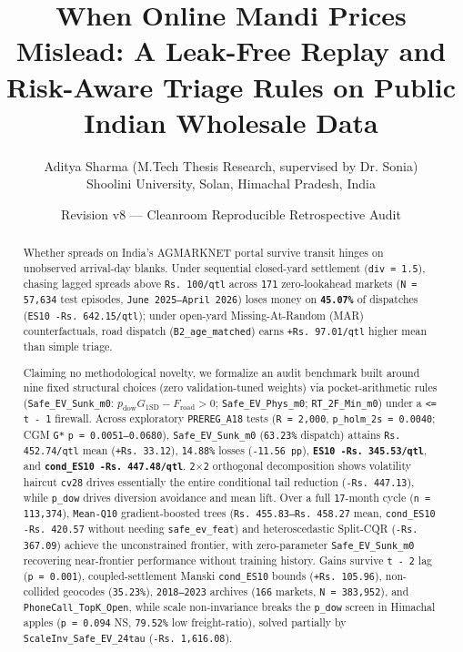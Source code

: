 \documentclass[11pt,a4paper]{article}
\title{When Online Mandi Prices Mislead: A Leak-Free Replay and Risk-Aware Triage Rules on Public Indian Wholesale Data}
\author{Aditya Sharma (M.Tech Thesis Research, supervised by Dr. Sonia) \\ Shoolini University, Solan, Himachal Pradesh, India}
\date{Revision v8 --- Cleanroom Reproducible Retrospective Audit}
\begin{document}
\maketitle

\begin{abstract}
Whether spreads on India's AGMARKNET portal survive transit hinges on unobserved arrival-day blanks. Under sequential closed-yard settlement (\texttt{div = 1.5}), chasing lagged spreads above \texttt{Rs.\,100/qtl} across \texttt{171} zero-lookahead markets (\texttt{N = 57,634} test episodes, \texttt{June 2025--April 2026}) loses money on \textbf{\texttt{45.07\%}} of dispatches (\texttt{ES10 -Rs.\,642.15/qtl}); under open-yard Missing-At-Random (MAR) counterfactuals, road dispatch (\texttt{B2\_age\_matched}) earns \texttt{+Rs.\,97.01/qtl} higher mean than simple triage.

Claiming no methodological novelty, we formalize an audit benchmark built around nine fixed structural choices (zero validation-tuned weights) via pocket-arithmetic rules (\texttt{Safe\_EV\_Sunk\_m0}: $p_{\text{dow}} G_{\text{1SD}} - F_{\text{road}} > 0$; \texttt{Safe\_EV\_Phys\_m0}; \texttt{RT\_2F\_Min\_m0}) under a \texttt{<= t - 1} firewall. Across exploratory \texttt{PREREG\_A18} tests (\texttt{R = 2,000}, \texttt{p\_holm\_2s = 0.0040}; CGM \texttt{G*} \texttt{p = 0.0051--0.0680}), \texttt{Safe\_EV\_Sunk\_m0} (\texttt{63.23\%} dispatch) attains \texttt{Rs.\,452.74/qtl} mean (\texttt{+Rs.\,33.12}), \texttt{14.88\%} losses (\texttt{-11.56 pp}), \textbf{\texttt{ES10 -Rs.\,345.53/qtl}}, and \textbf{\texttt{cond\_ES10 -Rs.\,447.48/qtl}}. \texttt{2$\times$2} orthogonal decomposition shows volatility haircut \texttt{cv28} drives essentially the entire conditional tail reduction (\texttt{-Rs.\,447.13}), while \texttt{p\_dow} drives diversion avoidance and mean lift. Over a full \texttt{17}-month cycle (\texttt{n = 113,374}), \texttt{Mean-Q10} gradient-boosted trees (\texttt{Rs.\,455.83--Rs.\,458.27} mean, \texttt{cond\_ES10 -Rs.\,420.57} without needing \texttt{safe\_ev\_feat}) and heteroscedastic Split-CQR (\texttt{-Rs.\,367.09}) achieve the unconstrained frontier, with zero-parameter \texttt{Safe\_EV\_Sunk\_m0} recovering near-frontier performance without training history. Gains survive \texttt{t - 2} lag (\texttt{p = 0.001}), coupled-settlement Manski \texttt{cond\_ES10} bounds (\texttt{+Rs.\,105.96}), non-collided geocodes (\texttt{35.23\%}), \texttt{2018--2023} archives (\texttt{166} markets, \texttt{N = 383,952}), and \texttt{PhoneCall\_TopK\_Open}, while scale non-invariance breaks the \texttt{p\_dow} screen in Himachal apples (\texttt{p = 0.094} NS, \texttt{79.52\%} low freight-ratio), solved partially by \texttt{ScaleInv\_Safe\_EV\_24tau} (\texttt{-Rs.\,1,616.08}).
\end{abstract}
\end{document}
